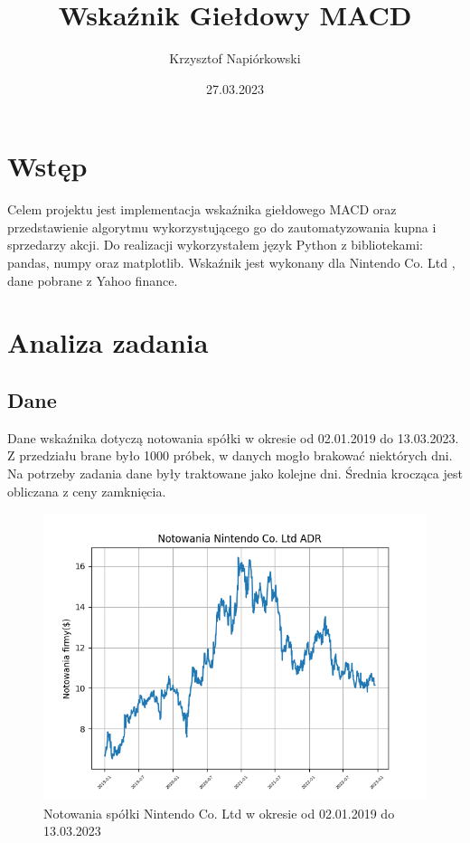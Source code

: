 \documentclass{article}
\title{Wskaźnik Giełdowy MACD}
\date{27.03.2023}
\author{Krzysztof Napiórkowski}
\newcommand{\companyName}{Nintendo Co. Ltd } %
\newcommand{\samplesFrom}{02.01.2019 }
\newcommand{\samplesTo}{13.03.2023}
\begin{document}
\maketitle
    \section{Wstęp}
    Celem projektu jest implementacja wskaźnika giełdowego MACD oraz przedstawienie algorytmu wykorzystującego go do zautomatyzowania kupna i sprzedarzy akcji. 
    Do realizacji wykorzystałem język Python z bibliotekami: pandas, numpy oraz matplotlib.
    Wskaźnik jest wykonany dla \companyName, dane pobrane z Yahoo finance.

    \section{Analiza zadania}
    
    \subsection{Dane}
    Dane wskaźnika dotyczą notowania spółki w okresie od \samplesFrom do \samplesTo. \\
    Z przedziału brane było 1000 próbek, w danych mogło brakować niektórych dni. Na potrzeby zadania dane były traktowane jako kolejne dni.
    Średnia krocząca jest obliczana z ceny zamknięcia.

    \begin{figure}[ht]
        \centering
        \includegraphics[scale=0.5]{Samples}
        \caption{Notowania spółki \companyName w okresie od \samplesFrom do \samplesTo}
        \label{fig:samples}
    \end{figure}
\end{document}
